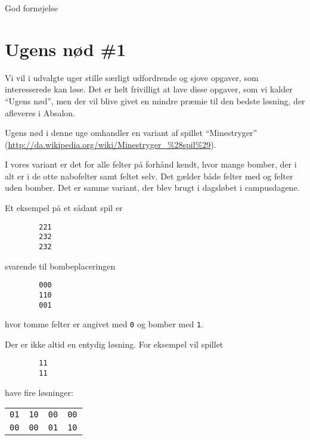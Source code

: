 \documentclass[a4paper]{article}
\begin{document}
\vspace{1ex}

\hfill God fornøjelse

\section*{Ugens nød \#1}

Vi vil i udvalgte uger stille særligt udfordrende og sjove opgaver,
som interesserede kan løse.  Det er helt frivilligt at lave disse
opgaver, som vi kalder ``Ugens nød'', men der vil blive givet en
mindre præmie til den bedste løsning, der afleveres i Absalon.

Ugens nød i denne uge omhandler en variant af spillet "`Minestryger"'
(\url{http://da.wikipedia.org/wiki/Minestryger_%28spil%29}).

I vores variant er det for alle felter på forhånd kendt, hvor mange
bomber, der i alt er i de otte nabofelter samt feltet selv.  Det
gælder både felter med og felter uden bomber.  Det er samme variant,
der blev brugt i dagsløbet i campusdagene.

Et eksempel på et sådant spil er

\begin{verbatim}
        221
        232
        232
\end{verbatim}
  
svarende til bombeplaceringen

\begin{verbatim}
        000
        110
        001
\end{verbatim}

\noindent
hvor tomme felter er angivet med \texttt{0} og bomber med \texttt{1}.

Der er ikke altid en entydig løsning.  For eksempel vil spillet

\begin{verbatim}
        11
        11
\end{verbatim}
 
\noindent
have fire løsninger:

\vspace{1ex}

\begin{tabular}{@{\quad\quad\quad}l@{\quad\quad}l@{\quad\quad}l@{\quad\quad}l}
\texttt{01} & \texttt{10} & \texttt{00} & \texttt{00}\\
\texttt{00} & \texttt{00} & \texttt{01} & \texttt{10}
\end{tabular}
\vspace{1ex}
\end{document}
